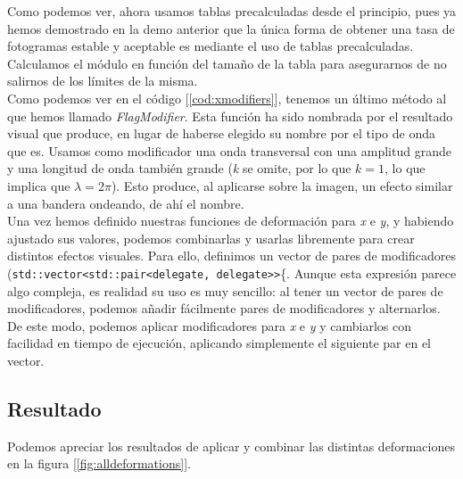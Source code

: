 Como podemos ver, ahora usamos tablas precalculadas desde el principio, pues ya hemos demostrado en la demo anterior que la única forma de obtener una tasa de fotogramas estable y aceptable es mediante el uso de tablas precalculadas. Calculamos el módulo en función del tamaño de la tabla para asegurarnos de no salirnos de los límites de la misma.\\

Como podemos ver en el código [\ref{cod:xmodifiers}], tenemos un último método al que hemos llamado \emph{FlagModifier}. Esta función ha sido nombrada por el resultado visual que produce, en lugar de haberse elegido su nombre por el tipo de onda que es. Usamos como modificador una onda transversal con una amplitud grande y una longitud de onda también grande (\emph{k} se omite, por lo que \(k = 1\), lo que implica que \(\lambda = 2 \pi\)). Esto produce, al aplicarse sobre la imagen, un efecto similar a una bandera ondeando, de ahí el nombre.\\

Una vez hemos definido nuestras funciones de deformación para \emph{x} e \emph{y}, y habiendo ajustado sus valores, podemos combinarlas y usarlas libremente para crear distintos efectos visuales. Para ello, definimos un vector de pares de modificadores (\lstinline{std::vector<std::pair<delegate, delegate>>}\{. Aunque esta expresión parece algo compleja, es realidad su uso es muy sencillo: al tener un vector de pares de modificadores, podemos añadir fácilmente pares de modificadores y alternarlos. De este modo, podemos aplicar modificadores para \emph{x} e \emph{y} y cambiarlos con facilidad en tiempo de ejecución, aplicando simplemente el siguiente par en el vector.\\

\subsection{Resultado}

Podemos apreciar los resultados de aplicar y combinar las distintas deformaciones en la figura [\ref{fig:alldeformations}].

